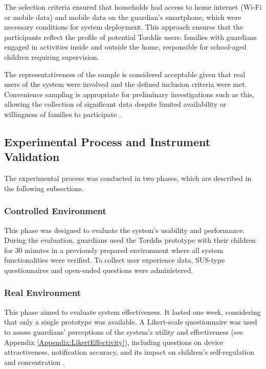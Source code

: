                 The selection criteria ensured that households had access to home internet (Wi-Fi or mobile data) and mobile data on the guardian’s smartphone, which were necessary conditions for system deployment. This approach ensures that the participants reflect the profile of potential Torddis users: families with guardians engaged in activities inside and outside the home, responsible for school-aged children requiring supervision.
                
                The representativeness of the sample is considered acceptable given that real users of the system were involved and the defined inclusion criteria were met. Convenience sampling is appropriate for preliminary investigations such as this, allowing the collection of significant data despite limited availability or willingness of families to participate \citep{DiPietro2025Meta}.
                
                \subsection{Experimental Process and Instrument Validation}
                The experimental process was conducted in two phases, which are described in the following subsections.
                
                \subsubsection{Controlled Environment}
                This phase was designed to evaluate the system’s usability and performance. During the evaluation, guardians used the Torddis prototype with their children for 30 minutes in a previously prepared environment where all system functionalities were verified. To collect user experience data, SUS-type questionnaires and open-ended questions were administered.
                
                \subsubsection{Real Environment}
                This phase aimed to evaluate system effectiveness. It lasted one week, considering that only a single prototype was available. A Likert-scale questionnaire was used to assess guardians' perceptions of the system’s utility and effectiveness (see Appendix \ref{Appendix:LikertEffectivity}), including questions on device attractiveness, notification accuracy, and its impact on children's self-regulation and concentration \citep{Ackermans2025Young}.
                
